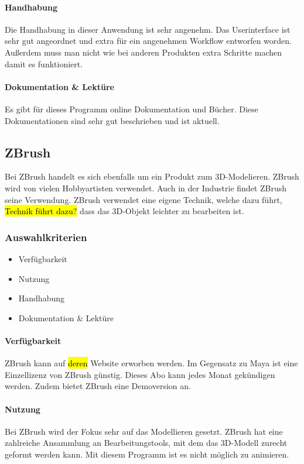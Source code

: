 \paragraph{Handhabung}
Die Handhabung in dieser Anwendung ist sehr angenehm. Das Userinterface ist sehr gut angeordnet und extra für ein angenehmen Workflow entworfen worden. Außerdem muss man nicht wie bei anderen Produkten extra Schritte machen damit es funktioniert.

\paragraph{Dokumentation \& Lektüre}
Es gibt für dieses Programm online Dokumentation und Bücher. Diese Dokumentationen sind sehr gut beschrieben und ist aktuell.

\pagebreak

\subsection{ZBrush}
Bei ZBrush handelt es sich ebenfalls um ein Produkt zum 3D-Modelieren. ZBrush wird von vielen Hobbyartisten verwendet. Auch in der Industrie findet ZBrush seine Verwendung. ZBrush verwendet eine eigene Technik, welche dazu führt, \hl{Technik führt dazu?} dass das 3D-Objekt leichter zu bearbeiten ist.

\subsubsection{Auswahlkriterien}
\begin{itemize}
    \item Verfügbarkeit
    \item Nutzung
    \item Handhabung
    \item Dokumentation \& Lektüre
\end{itemize}

\paragraph{Verfügbarkeit}
ZBrush kann auf \hl{deren} Website erworben werden. Im Gegensatz zu Maya ist eine Einzellizenz von ZBrush günstig. Dieses Abo kann jedes Monat gekündigen werden. Zudem bietet ZBrush eine Demoversion an.

\paragraph{Nutzung}
Bei ZBrush wird der Fokus sehr auf das Modellieren gesetzt. ZBrush hat eine zahlreiche Ansammlung an Bearbeitungstools, mit dem das 3D-Modell zurecht geformt werden kann. Mit diesem Programm ist es nicht möglich zu animieren.

